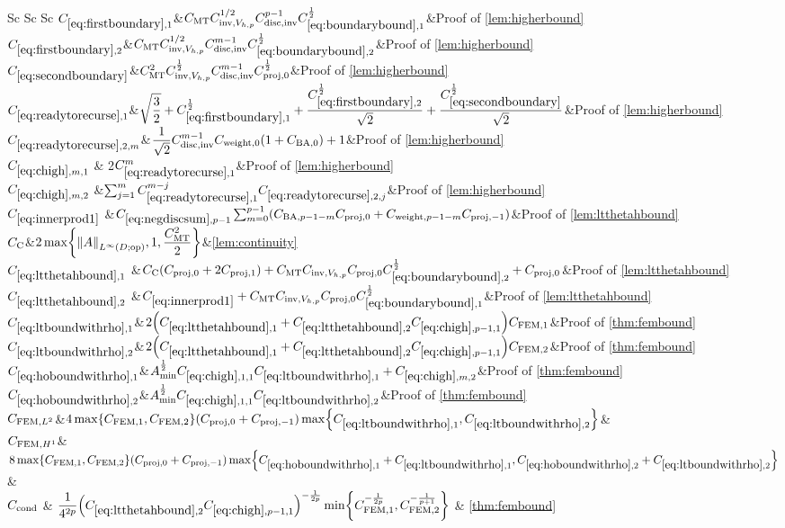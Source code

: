 \begin{longtabu}{Sc Sc Sc}
  $\CBo$&$\CMT \CinvVhp^{1/2} \Chinv^{p-1} \Cboundaryo^{\half} $&Proof of \cref{lem:higherbound}\\
  $\CBt$&$\CMT \CinvVhp^{1/2} \Chinv^{m-1} \Cboundaryt^{\half}$&Proof of \cref{lem:higherbound}\\
  $\CBth$&$C_{\mathrm{MT}}^2 C_{\mathrm{inv},V_{h,p}}^{\frac{1}{2}} C_{\mathrm{disc},\mathrm{inv}}^{m-1}C_{\mathrm{proj},0}^{\frac{1}{2}}$&Proof of \cref{lem:higherbound}\\
  $\CReco$&$\displaystyle\sqrt{\frac32} + \CBo^{\half} + \frac{\CBt^{\half}}{\sqrt{2}}+ \frac{\CBth^{\half}}{\sqrt{2}}$&Proof of \cref{lem:higherbound}\\
  $\CRectfn{m}$&$\displaystyle\frac1{\sqrt{2}}\Chinv^{m-1}\Cwfn{0}\mleft(1+\CSZfn{0}\mright)+1$&Proof of \cref{lem:higherbound}\\
  $\Chighmo$ & 2$\CReco^m$&Proof of \cref{lem:higherbound}\\
  $\Chighmt$ &$\sum_{j=1}^{m}\CReco^{m-j} \CRectfn{j}$&Proof of \cref{lem:higherbound}\\
  $\Cfourteen$ &$\Csumfn{p-1}\sum_{m=0}^{p-1} \mleft(\CSZfn{p-1-m}\Cmmofn{0} + \Cwfn{p-1-m} \Cmmofn{-1}\mright)$&Proof of \cref{lem:ltthetahbound}\\
    $C_{\mathrm{C}}$&$\displaystyle2\max\set{\NLiDop{A},1,\frac{\CMT^2}2}$&\cref{lem:continuity}\\
  $\Cfirst$ &$\Cc\mleft(\Cmmofn{0} + 2\Cmmofn{1}\mright) + \CMT \CinvVhp \Cmmofn{0} \Cboundaryt^{\half} + \Cmmofn{0}$&Proof of \cref{lem:ltthetahbound}\\
    $\Csecond$ &$\Cfourteen  + \CMT \CinvVhp \Cmmofn{0}\Cboundaryo^{\half}$&Proof of \cref{lem:ltthetahbound}\\
  $\CLtboundo$&$ 2\mleft(\Cfirst + \Csecond\Chighfn{p-1,1}\mright)\CFEMo$&Proof of \cref{thm:fembound}\\
  $\CLtboundt$&$2\mleft(\Cfirst + \Csecond\Chighfn{p-1,1}\mright)\CFEMt$&Proof of \cref{thm:fembound}\\
  $\CHoboundo$&$\Amin^{\half}\Chighfn{1,1}\CLtboundo+\Chighmt$&Proof of \cref{thm:fembound}\\
  $\CHoboundt$&$\Amin^{\half}\Chighfn{1,1}\CLtboundt$&Proof of \cref{thm:fembound}\\
  $C_{\mathrm{FEM},L^{2}}$&$4\max\set{\CFEMo,\CFEMt}\mleft(\Cmmofn{0} + \Cmmofn{-1}\mright) \max\set{\CLtboundo,\CLtboundt}$&\\
  $C_{\mathrm{FEM},H^{1}}$&$8\max\set{\CFEMo,\CFEMt}\mleft(\Cmmofn{0} + \Cmmofn{-1}\mright)\max\set{\CHoboundo+\CLtboundo,\CHoboundt+\CLtboundt}$&\\
    $C_{\mathrm{cond}}$ & $\displaystyle\frac1{4^{2p}} \mleft(\Csecond\Chighfn{p-1,1}\mright)^{-\frac1{2p}} \min\set{\CFEMo^{-\frac1{2p}},\CFEMt^{-\frac1{p+1}}}$ & \cref{thm:fembound}\\
\bottomrule
\end{longtabu}

